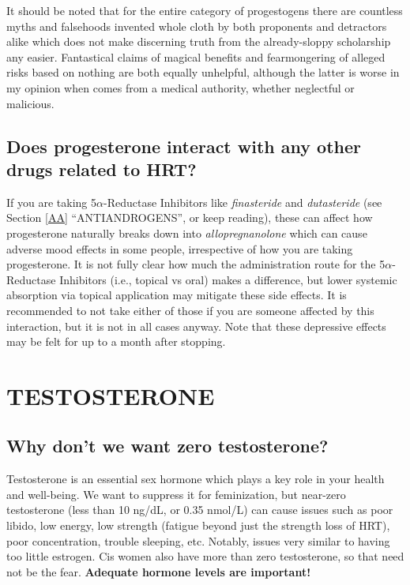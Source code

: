 \documentclass{article}
\begin{document}
It should be noted that for the entire category of progestogens there are countless myths and falsehoods invented whole cloth by both proponents and detractors alike which does not make discerning truth from the already-sloppy scholarship any easier. Fantastical claims of magical benefits and fearmongering of alleged risks based on nothing are both equally unhelpful, although the latter is worse in my opinion when comes from a medical authority, whether neglectful or malicious.

\subsection{Does progesterone interact with any other drugs related to HRT?}\label{8-18}

If you are taking 5$\alpha$-Reductase Inhibitors like \textit{finasteride} and \textit{dutasteride} (see Section \ref{AA} “ANTIANDROGENS”, or keep reading), these can affect how progesterone naturally breaks down into \textit{allopregnanolone} which can cause adverse mood effects in some people, irrespective of how you are taking progesterone. It is not fully clear how much the administration route for the 5$\alpha$-Reductase Inhibitors (i.e., topical vs oral) makes a difference, but lower systemic absorption via topical application may mitigate these side effects. It is recommended to not take either of those if you are someone affected by this interaction, but it is not in all cases anyway. Note that these depressive effects may be felt for up to a month after stopping.


\section{TESTOSTERONE}\label{T}

\subsection{Why don’t we want zero testosterone?}

Testosterone is an essential sex hormone which plays a key role in your health and well-being. We want to suppress it for feminization, but near-zero testosterone (less than 10 ng/dL, or 0.35 nmol/L) can cause issues such as poor libido, low energy, low strength (fatigue beyond just the strength loss of HRT), poor concentration, trouble sleeping, etc. Notably, issues very similar to having too little estrogen. Cis women also have more than zero testosterone, so that need not be the fear. \textbf{Adequate hormone levels are important!}
\end{document}
